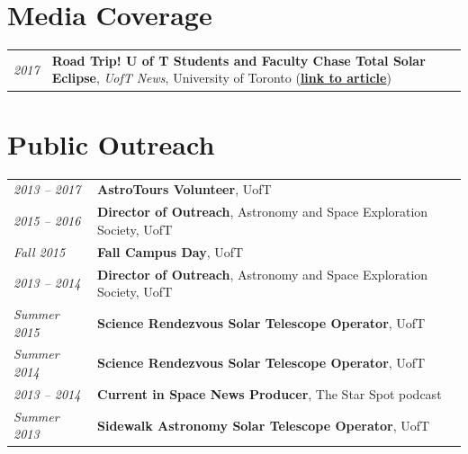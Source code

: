 \documentclass[10pt]{res} %
\begin{document}
\begin{resume}

\newpage
\section{\Large Media Coverage}
\vspace{-5pt} %
\noindent\makebox[\linewidth]{\rule{\textwidth}{0.4pt}}
\vspace{-20pt} %

\begin{table}[h!]
\begin{tabularx}{\textwidth}{lX}
\textit{2017} & \textbf{Road Trip! U of T Students and Faculty Chase Total Solar Eclipse}, \textit{UofT News}, University of Toronto (\href{https://www.utoronto.ca/news/road-trip-u-t-students-and-faculty-chase-total-solar-eclipse}{\textbf{link to article}})
\end{tabularx}
\end{table}


\section{\Large Public Outreach}
\vspace{-5pt} %
\noindent\makebox[\linewidth]{\rule{\textwidth}{0.4pt}}
\vspace{-20pt} %

\begin{table}[h!]
\begin{tabularx}{\textwidth}{lX}
\textit{2013 -- 2017} & \textbf{AstroTours Volunteer}, UofT \\
\textit{2015 -- 2016} & \textbf{Director of Outreach}, Astronomy and Space Exploration Society, UofT \\
\textit{Fall 2015} & \textbf{Fall Campus Day}, UofT \\
\textit{2013 -- 2014} & \textbf{Director of Outreach}, Astronomy and Space Exploration Society, UofT \\
\textit{Summer 2015} & \textbf{Science Rendezvous Solar Telescope Operator}, UofT \\
\textit{Summer 2014} & \textbf{Science Rendezvous Solar Telescope Operator}, UofT \\
\textit{2013 -- 2014} & \textbf{Current in Space News Producer}, The Star Spot podcast \\
\textit{Summer 2013} & \textbf{Sidewalk Astronomy Solar Telescope Operator}, UofT
\end{tabularx}
\end{table}



\end{resume} 
\end{document}
